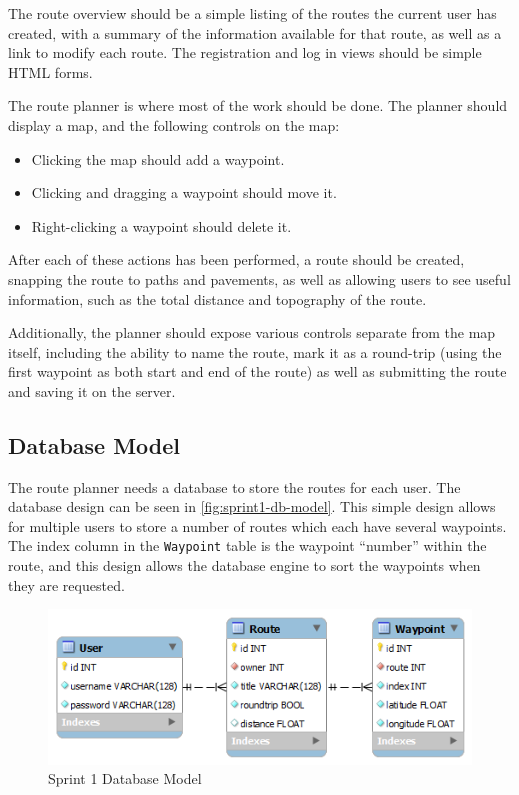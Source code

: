 The route overview should be a simple listing of the routes the current user has created, with a summary of the information available for that route, as well as a link to modify each route. The registration and log in views should be simple \ac{HTML} forms.

The route planner is where most of the work should be done. The planner should display a map, and the following controls on the map:

\begin{itemize}
	\item{Clicking the map should add a waypoint.}
	\item{Clicking and dragging a waypoint should move it.}
	\item{Right-clicking a waypoint should delete it.}
\end{itemize}

After each of these actions has been performed, a route should be created, snapping the route to paths and pavements, as well as allowing users to see useful information, such as the total distance and topography of the route.

Additionally, the planner should expose various controls separate from the map itself, including the ability to name the route, mark it as a round-trip (using the first waypoint as both start and end of the route) as well as submitting the route and saving it on the server.

\subsection{Database Model}

The route planner needs a database to store the routes for each user. The database design can be seen in \autoref{fig:sprint1-db-model}. This simple design allows for multiple users to store a number of routes which each have several waypoints. The index column in the \texttt{Waypoint} table is the waypoint ``number'' within the route, and this design allows the database engine to sort the waypoints when they are requested.

\begin{figure}[!ht]
	\centering
	\includegraphics[scale=0.5]{img/sprint1db.png}
	\caption{Sprint 1 Database Model}
	\label{fig:sprint1-db-model}
\end{figure}

